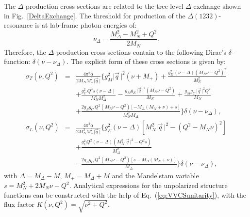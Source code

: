\documentclass[12pt,preprint,tightenlines,
showpacs,preprintnumbers,amsmath,amssymb,
a4paper,nofootinbib]{revtex4-1}
\def\beq{\begin{equation}}
\def\eeq{\end{equation}}
\def\bea{\begin{eqnarray}}
\def\eea{\end{eqnarray}}
\def\Eqref#1{Eq.~(\ref{eq:#1})}
\def\al{\alpha}
\def\de{\delta} \def\De{\Delta}
\def\si{\sigma} \def\Si{{\it\Sigma}}
\def\nn{\nonumber}
\begin{document}
The $\Delta$-production cross sections are related to the tree-level $\Delta$-exchange shown in Fig.~\ref{DeltaExchange}. The threshold for production of the $\Delta(1232)$-resonance is at lab-frame photon energies of:
\beq
\nu_\Delta=\frac{M_\Delta^2-M_N^2+Q^2}{2M_N}.
\eeq
Therefore, the $\Delta$-production cross sections contain to the following Dirac's $\de$-function: $\delta(\nu-\nu_\Delta)$. The
explicit form of these cross sections is given by:
\bea
\si_T(\nu,Q^2)&=&\frac{4\pi^2 \al}{2M_NM_+^2\vert \vec{q}\,\vert}\Bigg\{g_M^2 \vert \vec{q}\, \vert ^2 (\nu +M_+)+\frac{g_E^2\, (\nu -\varDelta ) \left(M_N\nu -Q^2\right)^2}{M_N^2}\\
&&+\frac{g_C^2 \,Q^4 s (\nu -\varDelta )}{M_N^2 M_\Delta^2}-\frac{g_M g_E\, \vert \vec{q}\, \vert ^2 \left(M_N\nu -Q^2\right)}{M_N}+\frac{g_M g_C\, \vert \vec{q}\, \vert ^2 Q^2}{M_N}\nn\\
&&+\frac{2 g_E g_C \,Q^2 \left(M_N\nu -Q^2\right) [-M_\Delta(M_N+\nu)+s]}{M_N^2 M_\Delta}\Bigg\}\delta\!\left(\nu-\nu_\Delta\right),\nn\\
\si_L(\nu,Q^2)&=&\frac{4\pi^2 \al}{2M_N^3M_+^2\vert \vec{q}\,\vert}\Bigg\{g_E^2(\nu-\varDelta)\left[M_N^2 \vert \vec{q}\, \vert^2-(Q^2-M_N\nu)^2\right]\\
&&+\frac{g_C^2 Q^2(\nu-\varDelta)(M_N^2 \vert \vec{q}\, \vert^2-Q^2 s)}{M_\Delta^2}\nn\\
&&-\frac{2 g_E g_C \,Q^2 \left(M_N\nu -Q^2\right) [s-M_\Delta(M_N+\nu)]}{ M_\Delta}\Bigg\}\delta\!\left(\nu-\nu_\Delta\right),\nn
\eea
with $\varDelta=M_\Delta - M$, $M_+=M_\Delta + M$ and the Mandelstam variable $s=M_N^2+2M_N \nu-Q^2$.
Analytical expressions for the unpolarized structure functions can be constructed with the help of \Eqref{VVCSunitarity}, with the flux factor $K(\nu,Q^2)=\sqrt{\nu^2+Q^2}$.
\end{document}
